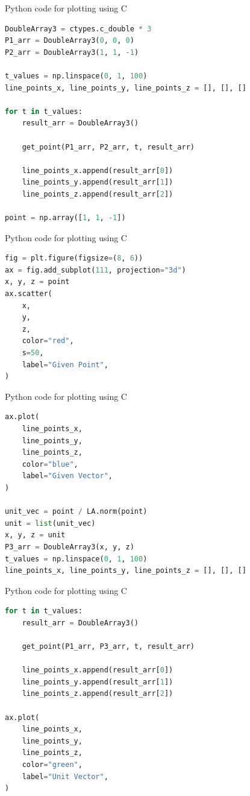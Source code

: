 \documentclass{beamer}
\theoremstyle{remark}
\numberwithin{equation}{section}
\begin{document}
\begin{frame}[fragile]{Python code for plotting using C}
\begin{lstlisting}[language=Python]
DoubleArray3 = ctypes.c_double * 3
P1_arr = DoubleArray3(0, 0, 0)
P2_arr = DoubleArray3(1, 1, -1)

t_values = np.linspace(0, 1, 100)
line_points_x, line_points_y, line_points_z = [], [], []

for t in t_values:
    result_arr = DoubleArray3()

    get_point(P1_arr, P2_arr, t, result_arr)

    line_points_x.append(result_arr[0])
    line_points_y.append(result_arr[1])
    line_points_z.append(result_arr[2])

point = np.array([1, 1, -1])

\end{lstlisting}
\end{frame}

\begin{frame}[fragile]{Python code for plotting using C}
\begin{lstlisting}[language=Python]
fig = plt.figure(figsize=(8, 6))
ax = fig.add_subplot(111, projection="3d")
x, y, z = point
ax.scatter(
    x,
    y,
    z,
    color="red",
    s=50,
    label="Given Point",
)

\end{lstlisting}
\end{frame}

\begin{frame}[fragile]{Python code for plotting using C}
\begin{lstlisting}[language=Python]
ax.plot(
    line_points_x,
    line_points_y,
    line_points_z,
    color="blue",
    label="Given Vector",
)

unit_vec = point / LA.norm(point)
unit = list(unit_vec)
x, y, z = unit
P3_arr = DoubleArray3(x, y, z)
t_values = np.linspace(0, 1, 100)
line_points_x, line_points_y, line_points_z = [], [], []

\end{lstlisting}
\end{frame}

\begin{frame}[fragile]{Python code for plotting using C}
\begin{lstlisting}[language=Python]
for t in t_values:
    result_arr = DoubleArray3()

    get_point(P1_arr, P3_arr, t, result_arr)

    line_points_x.append(result_arr[0])
    line_points_y.append(result_arr[1])
    line_points_z.append(result_arr[2])

ax.plot(
    line_points_x,
    line_points_y,
    line_points_z,
    color="green",
    label="Unit Vector",
)
\end{lstlisting}
\end{frame}
\end{document}
